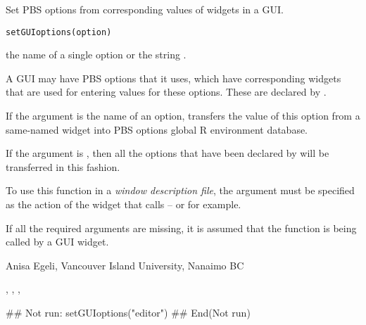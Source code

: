 \documentclass[letterpaper]{book}
\begin{document}
\begin{Description}\relax
Set PBS options from corresponding values of widgets in a GUI.
\end{Description}
\begin{Usage}
\begin{verbatim}
setGUIoptions(option)
\end{verbatim}
\end{Usage}
\begin{Arguments}
\begin{ldescription}
\item[\code{option}] the name of a single option or the string .
\end{ldescription}
\end{Arguments}
\begin{Details}\relax
A GUI may have PBS options that it uses, which have corresponding widgets that
are used for entering values for these options. These are declared by
.

If the  argument is the name of an option, 
 transfers the value of this option from a 
same-named widget into PBS options global R environment database.

If the  argument is , then all the 
options that have been declared by  
will be transferred in this fashion.

To use this function in a \emph{window description file}, the 
 argument must be specified as the action of the 
widget that calls  --  
or  for example.
\end{Details}
\begin{Note}\relax
If all the required arguments are missing, it is assumed that 
the function is being called by a GUI widget.
\end{Note}
\begin{Author}\relax
Anisa Egeli, Vancouver Island University, Nanaimo BC
\end{Author}
\begin{SeeAlso}\relax
{}, ,
,
\end{SeeAlso}
\begin{Examples}
\begin{ExampleCode}
## Not run: 
setGUIoptions("editor")
## End(Not run)
\end{ExampleCode}
\end{Examples}
\end{document}
